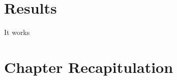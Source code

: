 \documentclass[thesis-solanki.tex]{subfiles}
\begin{document}
\section{Results}

It works



\section{Chapter Recapitulation}

\ifMain
\begin{scope}
  \nolinenumbers
  \enotesize
  \par
  \begin{singlespace}
  \setlength{\parskip}{12pt plus 2pt minus 1pt}
  \theendnotes
  \par
  \end{singlespace}
\end{scope}
\fi
\end{document}
